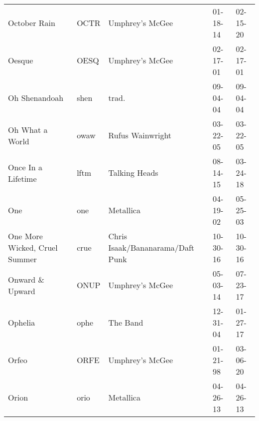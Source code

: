 \begin{longtable}{p{}p{}p{}p{}p{}}
                                                            October Rain &          OCTR &                                          Umphrey's McGee &              01-18-14 &             02-15-20 \\
                                                                  Oesque &          OESQ &                                          Umphrey's McGee &              02-17-01 &             02-17-01 \\
                                                           Oh Shenandoah &          shen &                                                    trad. &              09-04-04 &             09-04-04 \\
                                                         Oh What a World &          owaw &                                         Rufus Wainwright &              03-22-05 &             03-22-05 \\
                                                      Once In a Lifetime &          lftm &                                            Talking Heads &              08-14-15 &             03-24-18 \\
                                                                     One &           one &                                                Metallica &              04-19-02 &             05-25-03 \\
                                           One More Wicked, Cruel Summer &          crue &                         Chris Isaak/Bananarama/Daft Punk &              10-30-16 &             10-30-16 \\
                                                        Onward \& Upward &          ONUP &                                          Umphrey's McGee &              05-03-14 &             07-23-17 \\
                                                                 Ophelia &          ophe &                                                 The Band &              12-31-04 &             01-27-17 \\
                                                                   Orfeo &          ORFE &                                          Umphrey's McGee &              01-21-98 &             03-06-20 \\
                                                                   Orion &          orio &                                                Metallica &              04-26-13 &             04-26-13 \\

\end{longtable}
